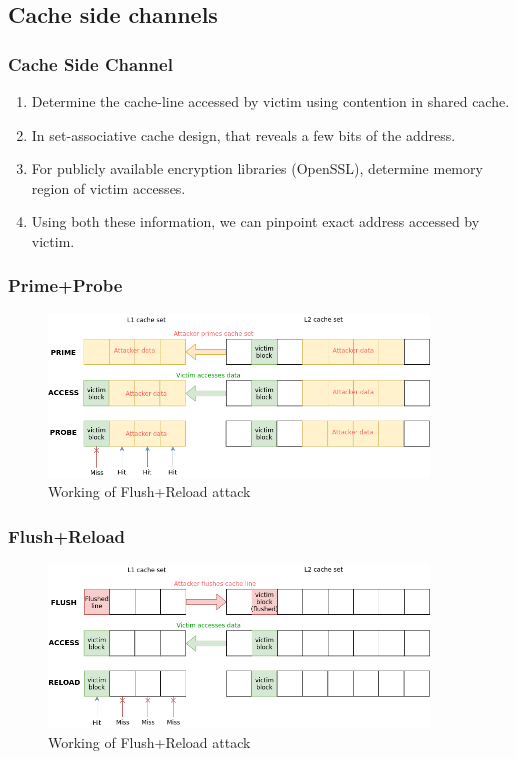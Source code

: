 \documentclass[10pt]{beamer}
\begin{document}
\subsection{Cache side channels}
\begin{frame}
\frametitle{Cache Side Channel}
\begin{enumerate}
    \item Determine the cache-line accessed by victim using contention in shared cache.
    \item In set-associative cache design, that reveals a few bits of the address.
    \item For publicly available encryption libraries (OpenSSL), determine memory region of victim accesses.
    \item Using both these information, we can pinpoint exact address accessed by victim.
\end{enumerate}
\end{frame}

\begin{frame}
\frametitle{Prime+Probe}
\begin{figure}
\includegraphics[width=0.9\textwidth]{prime_probe}
\caption{Working of Flush+Reload attack}
\end{figure}
\end{frame}

\begin{frame}
\frametitle{Flush+Reload}
\begin{figure}
\includegraphics[width=0.9\textwidth]{flush_reload}
\caption{Working of Flush+Reload attack}
\end{figure}
\end{frame}
\end{document}
